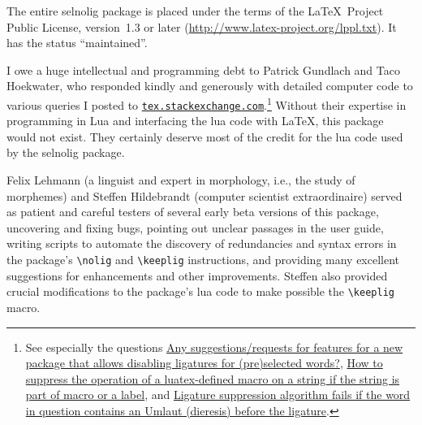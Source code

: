\documentclass[11pt]{article}
\newcommand{\pkg}[1]{\textsf{#1}}
\newcommand{\cmmd}[1]{\texttt{\textbackslash #1}}
\begin{document}
The entire \pkg{selnolig} package is placed under the terms of the \LaTeX\ Project Public License, version~1.3 or later (\url{http://www.latex-project.org/lppl.txt}).
It has the status \enquote{maintained}.

I owe a huge intellectual and programming debt to Patrick Gundlach and Taco Hoekwater, who responded kindly and generously with detailed computer code to various queries I posted to \href{http://tex.stackexchange.com}{\texttt{tex.stackexchange.com}}.\footnote{See especially the questions \href{http://tex.stackexchange.com/q/37443/5001}{Any suggestions/requests for features for a new package that allows disabling ligatures for (pre)selected words?}, \href{http://tex.stackexchange.com/q/48516/5001}{How to suppress the operation of a luatex-defined macro on a string if the string is part of macro or a label}, and \href{http://tex.stackexchange.com/q/63005/5001}{Ligature suppression algorithm fails if the word in question contains an Umlaut (dieresis) before the ligature}.} Without their expertise in programming in Lua and interfacing the lua code with \LaTeX, this package would not exist. They certainly deserve most of the credit for the lua code used by the \pkg{selnolig} package.

Felix Lehmann (a linguist and expert in morphology, i.e., the study of morphemes) and Steffen Hildebrandt (computer scientist extraordinaire) served as patient and careful testers of several early beta versions of this package, uncovering and fixing bugs, pointing out unclear passages in the user guide, writing scripts to automate the discovery of redundancies and syntax errors in the package's \cmmd{nolig} and \cmmd{keeplig} instructions, and providing many excellent suggestions for enhancements and other improvements. Steffen also provided crucial modifications to the package's lua code to make possible the \cmmd{keeplig} macro.
\end{document}
